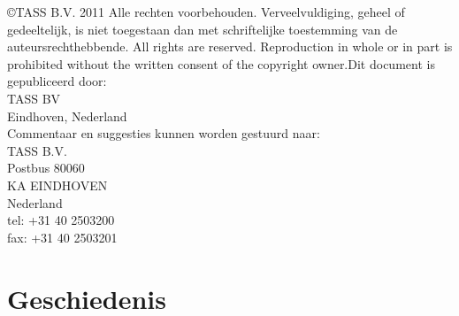 \documentclass[]{article}
\begin{document}
\vspace*{\fill}

\newpage

\noindent\copyright  TASS B.V. 2011
Alle rechten voorbehouden. Verveelvuldiging, geheel of gedeeltelijk, is
niet toegestaan dan met schriftelijke toestemming van de
auteursrechthebbende.
All rights are reserved. Reproduction in whole or in part is prohibited
without the written consent of the copyright owner.Dit document is
gepubliceerd door:\\
TASS BV\\
Eindhoven, Nederland\\

\noindent Commentaar en suggesties kunnen worden gestuurd naar:\\
\indent TASS B.V.\\
\indent\indent Postbus 80060\\
\indent{} KA  EINDHOVEN\\
\indent\indent Nederland\\
\indent\indent tel:  +31 40 2503200\\
\indent\indent fax:  +31 40 2503201\\

\vspace*{\fill}

\section*{Geschiedenis}
\end{document}
